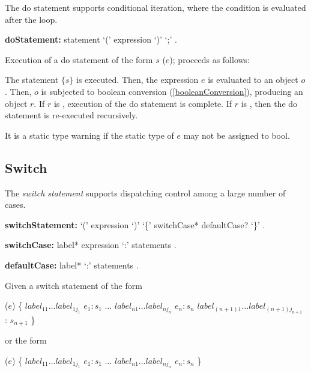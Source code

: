 \documentclass{article}
\newcommand{\code}[1]{{\sf #1}}
\begin{document}
\LMHash{}
The do statement supports conditional iteration, where the condition is evaluated after the loop.

\begin{grammar}
{\bf doStatement:}
    \DO{} statement \WHILE{} `(' expression `)' `{\escapegrammar ;}'%
      .
 \end{grammar}

    
\LMHash{}
Execution of a do statement of the form \code{\DO{} $s$ \WHILE{} ($e$);} proceeds as follows: 

\LMHash{}
The statement $\{s\}$ is executed. Then, the expression $e$ is evaluated to an object $o$. Then, $o$ is  subjected to boolean conversion (\ref{booleanConversion}), producing an object $r$. If $r$ is \FALSE{}, execution of the do statement is complete. If $r$ is \TRUE{}, then the do statement is re-executed recursively. 

\LMHash{}
It is a static type warning if the static type of $e$ may not be assigned to \code{bool}. 

\subsection{Switch}

\LMHash{}
The {\em switch statement} supports dispatching control among a large number of cases.

 \begin{grammar}
{\bf switchStatement:}
      \SWITCH{} `(' expression `)' `\{' switchCase* defaultCase? `\}'%
    .


{\bf switchCase:}
      label* \CASE{} expression `{\escapegrammar :}' statements
    .

{\bf defaultCase:}
      label*  \DEFAULT{} `{\escapegrammar :}' statements
    .
 \end{grammar}
 
\LMHash{}
 Given a switch statement of the form 
 
\begin{dartCode}
\SWITCH{} ($e$) \{
   $label_{11} \ldots label_{1j_1}$ \CASE{} $e_1: s_1$
   $\ldots$
   $label_{n1} \ldots label_{nj_n}$ \CASE{} $e_n: s_n$
   $label_{(n+1)1} \ldots label_{(n+1)j_{n+1}}$ \DEFAULT{}: $s_{n+1}$
\}
\end{dartCode}
 
 or the form 
 
\begin{dartCode}
\SWITCH{} ($e$) \{
   $label_{11} \ldots label_{1j_1}$ \CASE{} $e_1: s_1$
   $\ldots$
   $label_{n1} \ldots label_{nj_n}$ \CASE{} $e_n: s_n$
\}
\end{dartCode}
 
\end{document}
